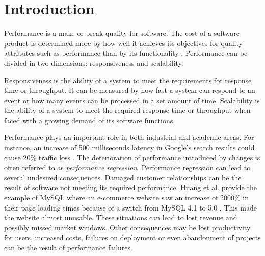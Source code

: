 \chapter{Introduction}
\label{chp:introduction}





% 

Performance is a make-or-break quality for software.
The cost of a software product is determined more by how well it achieves its objectives for quality attributes such as performance than by its functionality \cite{smith2003software}.
Performance can be divided in two dimensions: responsiveness and scalability.

Responsiveness is the ability of a system to meet the requirements for response time or throughput.
It can be measured by how fast a system can respond to an event or how many events can be processed in a set amount of time.
Scalability is the ability of a system to meet the required response time or throughput when faced with a growing demand of its software functions.

Performance plays an important role in both industrial and academic areas.
For instance, an increase of 500 milliseconds latency in Google's search results could cause 20\% traffic loss \cite{mayer2009search}.  
The deterioration of performance introduced by changes is often referred to as \emph{performance regression}.
Performance regression can lead to several undesired consequences.
Damaged customer relationships can be the result of software not meeting its required performance.
Huang et al. provide the example of MySQL where an e-commerce website saw an increase of 2000\% in their page loading times because of a switch from MySQL 4.1 to 5.0 \cite{huang2014performance}.
This made the website almost unusable.
These situations can lead to lost revenue and possibly missed market windows.
Other consequences may be lost productivity for users, increased costs, failures on deployment or even abandonment of projects can be the result of performance failures \cite{woodside2007future, williams1998performance}.


